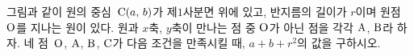그림과 같이 원의 중심~$\mathrm{C}(a,\mkern3mu b)$가 제$1$사분면 위에 있고, 반지름의 길이가 $r$이며 원점~$\mathrm{O}$를 지나는 원이 있다. 원과 $x$축, $y$축이 만나는 점 중 $\mathrm{O}$가 아닌 점을 각각 $\mathrm{A}$, $\mathrm{B}$라 하자. 네 점~$\mathrm{O}$, $\mathrm{A}$, $\mathrm{B}$, $\mathrm{C}$가 다음 조건을 만족시킬 때, $a+b+r^2$의 값을 구하시오.
\par\smallskip\begin{center}\resizebox{\ifdim\width>\linewidth\linewidth\else\width\fi}{!}{}\end{center}
